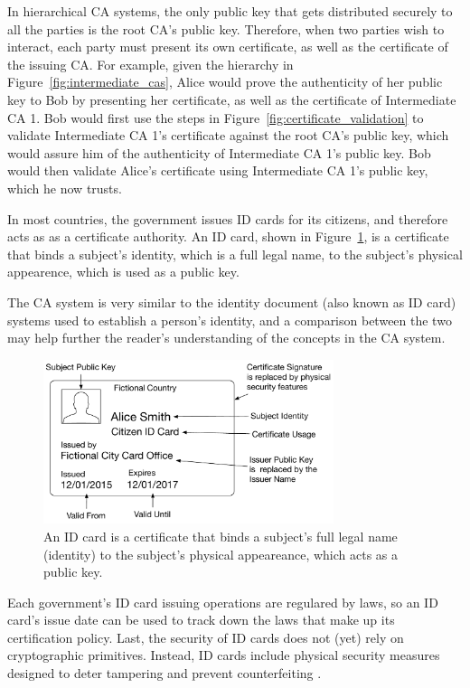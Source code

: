 In hierarchical CA systems, the only public key that gets distributed securely
to all the parties is the root CA's public key. Therefore, when two parties
wish to interact, each party must present its own certificate, as well as the
certificate of the issuing CA. For example, given the hierarchy in
Figure~\ref{fig:intermediate_cas}, Alice would prove the authenticity of her
public key to Bob by presenting her certificate, as well as the certificate of
Intermediate CA 1. Bob would first use the steps in
Figure~\ref{fig:certificate_validation} to validate Intermediate CA 1's
certificate against the root CA's public key, which would assure him of the
authenticity of Intermediate CA 1's public key. Bob would then validate Alice's
certificate using Intermediate CA 1's public key, which he now trusts.

In most countries, the government issues ID cards for its citizens, and
therefore acts as as a certificate authority. An ID card, shown in
Figure~\ref{fig:id_card_as_certificate}, is a certificate that binds a
subject's identity, which is a full legal name, to the subject's physical
appearence, which is used as a public key.

The CA system is very similar to the identity document (also known as ID card)
systems used to establish a person's identity, and a comparison between the two
may help further the reader's understanding of the concepts in the CA system.

\begin{figure}[hbt]
  \centering
  \includegraphics[width=85mm]{figures/id_card_as_certificate.pdf}
  \caption{
    An ID card is a certificate that binds a subject's full legal name
    (identity) to the subject's physical appeareance, which acts as a public
    key.
  }
  \label{fig:id_card_as_certificate}
\end{figure}

Each government's ID card issuing operations are regulared by laws, so an ID
card's issue date can be used to track down the laws that make up its
certification policy. Last, the security of ID cards does not (yet) rely on
cryptographic primitives. Instead, ID cards include physical security measures
designed to deter tampering and prevent counterfeiting .


